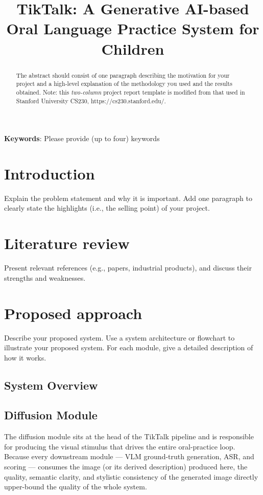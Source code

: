 \documentclass{article}
\title{TikTalk: A Generative AI-based Oral Language Practice System for Children}
\begin{document}
%
\maketitle
%

\begin{abstract}

The abstract should consist of one paragraph describing the motivation for your project and a high-level explanation of the methodology you used and the results obtained. Note: this \textit{two-column} project report template is modified from that used in Stanford University CS230, https://cs230.stanford.edu/. 

\end{abstract}
%

\textbf{Keywords}: Please provide (up to four) keywords

\section{Introduction}
\label{sec:intro}

Explain the problem statement and why it is important. Add one paragraph to clearly state the highlights (i.e., the selling point) of your project.

\section{Literature review}
Present relevant references (e.g., papers, industrial products), and discuss their strengths and weaknesses.

\section{Proposed approach}
Describe your proposed system. Use a system architecture or flowchart to illustrate your proposed system. For each module, give a detailed description of how it works.

\subsection{System Overview}
\subsection{Diffusion Module}
\label{sec:diffusion}

The diffusion module sits at the head of the TikTalk pipeline and is
responsible for producing the visual stimulus that drives the entire
oral-practice loop. Because every downstream module — VLM ground-truth
generation, ASR, and scoring — consumes the image (or its derived
description) produced here, the quality, semantic clarity, and stylistic
consistency of the generated image directly upper-bound the quality of
the whole system.
\end{document}
